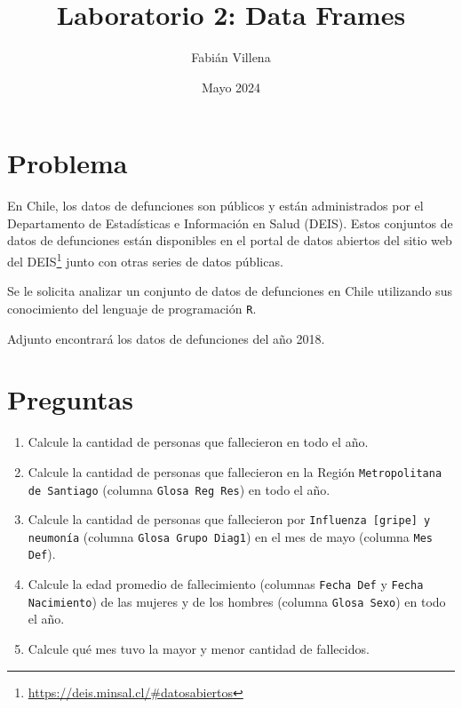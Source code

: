 \documentclass{article}
\title{Laboratorio 2: Data Frames}
\author{Fabián Villena}
\date{Mayo 2024}
\begin{document}
\maketitle

\section{Problema}

En Chile, los datos de defunciones son públicos y están administrados por el Departamento de Estadísticas e Información en Salud (DEIS). Estos conjuntos de datos de defunciones están disponibles en el portal de datos abiertos del sitio web del DEIS\footnote{\url{https://deis.minsal.cl/\#datosabiertos}} junto con otras series de datos públicas.

Se le solicita analizar un conjunto de datos de defunciones en Chile utilizando sus conocimiento del lenguaje de programación \texttt{R}.

Adjunto encontrará los datos de defunciones del año 2018.

\section{Preguntas}

\begin{enumerate}
    \item Calcule la cantidad de personas que fallecieron en todo el año.
    \item Calcule la cantidad de personas que fallecieron en la Región \texttt{Metropolitana de Santiago} (columna \texttt{Glosa Reg Res}) en todo el año.
    \item Calcule la cantidad de personas que fallecieron por \texttt{Influenza [gripe] y neumonía} (columna \texttt{Glosa Grupo Diag1}) en el mes de mayo (columna \texttt{Mes Def}).
    \item Calcule la edad promedio de fallecimiento (columnas \texttt{Fecha Def} y \texttt{Fecha Nacimiento}) de las mujeres y de los hombres (columna \texttt{Glosa Sexo}) en todo el año.
    \item Calcule qué mes tuvo la mayor y menor cantidad de fallecidos.
\end{enumerate}
\end{document}
